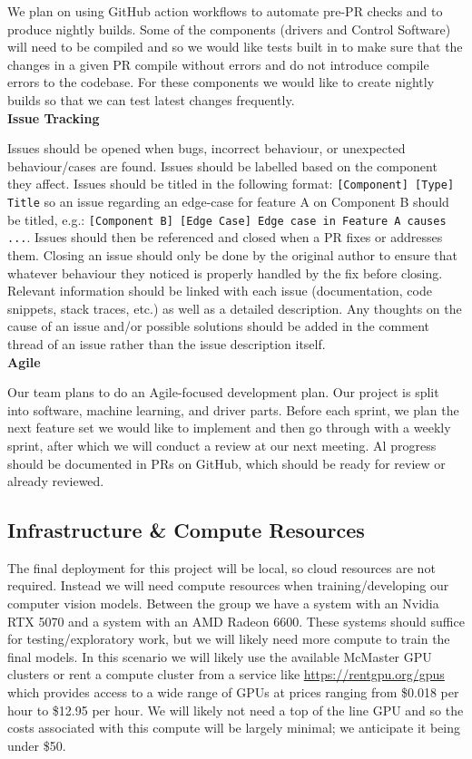 \documentclass{article}
\begin{document}
We plan on using GitHub action workflows to automate pre-PR checks and to produce nightly builds. Some of the components (drivers and Control Software) will need to be compiled and so we would like tests built in to make sure that the changes in a given PR compile without errors and do not introduce compile errors to the codebase. For these components we would like to create nightly builds so that we can test latest changes frequently. \\

\textbf{Issue Tracking}

Issues should be opened when bugs, incorrect behaviour, or unexpected behaviour/cases are found. Issues should be labelled based on the component they affect. Issues should be titled in the following format: \texttt{[Component] [Type] Title} so an issue regarding an edge-case for feature A on Component B should be titled, e.g.: \texttt{[Component B] [Edge Case] Edge case in Feature A causes ...}. Issues should then be referenced and closed when a PR fixes or addresses them. Closing an issue should only be done by the original author to ensure that whatever behaviour they noticed is properly handled by the fix before closing. Relevant information should be linked with each issue (documentation, code snippets, stack traces, etc.) as well as a detailed description. Any thoughts on the cause of an issue and/or possible solutions should be added in the comment thread of an issue rather than the issue description itself.\\

\textbf{Agile}

Our team plans to do an Agile-focused development plan. Our project is split into software, machine learning, and driver parts. Before each sprint, we plan the next feature set we would like to implement and then go through with a weekly sprint, after which we will conduct a review at our next meeting. Al progress should be documented in PRs on GitHub, which should be ready for review or already reviewed.

\subsection{Infrastructure \& Compute Resources}

The final deployment for this project will be local, so cloud resources are not required. Instead we will need compute resources when training/developing our computer vision models. Between the group we have a system with an Nvidia RTX 5070 and a system with an AMD Radeon 6600. These systems should suffice for testing/exploratory work, but we will likely need more compute to train the final models. In this scenario we will likely use the available McMaster GPU clusters or rent a compute cluster from a service like \href{https://rentgpu.org/gpus}{https://rentgpu.org/gpus} which provides access to a wide range of GPUs at prices ranging from \$0.018 per hour to \$12.95 per hour. We will likely not need a top of the line GPU and so the costs associated with this compute will be largely minimal; we anticipate it being under \$50.
\end{document}
